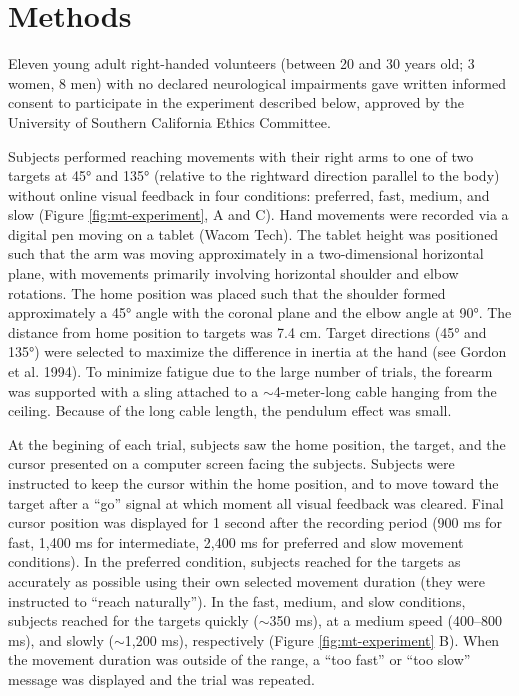 \section{Methods}
Eleven young adult right-handed volunteers (between 20 and 30 years old; 3 women, 8 men) with no declared neurological impairments gave written informed consent to participate in the experiment described below, approved by the University of Southern California Ethics Committee.

Subjects performed reaching movements with their right arms to one of two targets at \ang{45} and \ang{135} (relative to the rightward direction parallel to the body) without online visual feedback in four conditions: preferred, fast, medium, and slow (Figure \ref{fig:mt-experiment}, A and C).  
Hand movements were recorded via a digital pen moving on a tablet (Wacom Tech). 
The tablet height was positioned such that the arm was moving approximately in a two-dimensional horizontal plane, with movements primarily involving horizontal shoulder and elbow rotations. 
The home position was placed such that the shoulder formed approximately a \ang{45} angle with the coronal plane and the elbow angle at \ang{90}. 
The distance from home position to targets was 7.4 cm. 
Target directions (\ang{45} and \ang{135}) were selected to maximize the difference in inertia at the hand (see Gordon et al. 1994). 
To minimize fatigue due to the large number of trials, the forearm was supported with a sling attached to a $\sim$4-meter-long cable hanging from the ceiling. 
Because of the long cable length, the pendulum effect was small.

At the begining of each trial, subjects saw the home position, the target, and the cursor presented on a computer screen facing the subjects. 
Subjects were instructed to keep the cursor within the home position, and to move toward the target after a “go” signal at which moment all visual feedback was cleared. 
Final cursor position was displayed for 1 second after the recording period (900 ms for fast, 1,400 ms for intermediate, 2,400 ms for preferred and slow movement conditions). 
In the preferred condition, subjects reached for the targets as accurately as possible using their own selected movement duration (they were instructed to “reach naturally”). 
In the fast, medium, and slow conditions, subjects reached for the targets quickly ($\sim$350 ms), at a medium speed (400--800 ms), and slowly ($\sim$1,200 ms), respectively (Figure \ref{fig:mt-experiment} B). 
When the movement duration was outside of the range, a “too fast” or “too slow” message was displayed and the trial was repeated.
 
